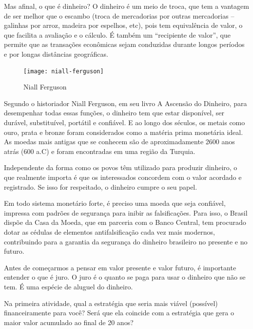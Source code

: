 \begin{knowledge}

Mas afinal, o que é dinheiro? O dinheiro é um meio de troca, que tem a vantagem de ser melhor que o escambo (troca de mercadorias por outras mercadorias – galinhas por arroz, madeira por espelhos, etc), pois tem equivalência de valor, o que facilita a avaliação e o cálculo. É também um “recipiente de valor”, que permite que as transações econômicas sejam conduzidas durante longos períodos e por longas distâncias geográficas.

\begin{figure}
\vspace{-1em}
\texttt{[image: niall-ferguson]}

\caption{Niall Ferguson}
\end{figure}

Segundo o historiador Niall Ferguson, em seu livro A Ascensão do Dinheiro, para desempenhar todas essas funções, o dinheiro tem que estar disponível, ser durável, substituível, portátil e confiável. E ao longo dos séculos, os metais como ouro, prata e bronze foram considerados como a matéria prima monetária ideal. As moedas mais antigas que se conhecem são de aproximadamente 2600 anos atrás (600 a.C) e foram encontradas em uma região da Turquia. 

Independente da forma como os povos têm utilizado para produzir dinheiro, o que realmente importa é que os interessados concordem com o valor acordado e registrado. Se isso for respeitado, o dinheiro cumpre o seu papel. 

Em todo sistema monetário forte, é preciso uma moeda que seja confiável, impressa com padrões de segurança para inibir as falsificações. Para isso, o Brasil dispõe da Casa da Moeda, que em parceria com o Banco Central, tem procurado dotar as cédulas de elementos antifalsificação cada vez mais modernos, contribuindo para a garantia da segurança do dinheiro brasileiro no presente e no futuro.

\end{knowledge}

\label{fin-arg-3}

Antes de começarmos a pensar em valor presente e valor futuro, é importante entender o que é juro. O juro é o quanto se paga para usar o dinheiro que não se tem. É uma espécie de aluguel do dinheiro.

Na primeira atividade, qual a estratégia que seria mais viável (possível) financeiramente para você? Será que ela coincide com a estratégia que gera o maior valor acumulado ao final de 20 anos?

